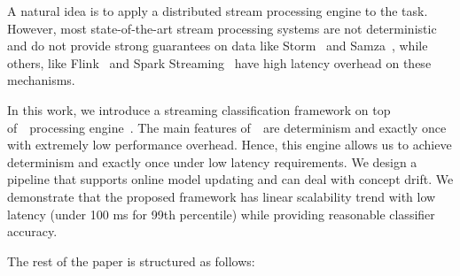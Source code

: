 A natural idea is to apply a distributed stream processing engine to the task. However, most state-of-the-art stream processing systems are not deterministic and do not provide strong guarantees on data like Storm~\cite{apache:storm} and Samza~\cite{Noghabi:2017:SSS:3137765.3137770}, while others, like Flink~\cite{Carbone:2017:SMA:3137765.3137777} and Spark Streaming~\cite{Zaharia:2012:DSE:2342763.2342773} have high latency overhead on these mechanisms. 

In this work, we introduce a streaming classification framework on top of~\FlameStream\ processing engine~\cite{we2018beyondmr, we2018adbis}. The main features of~\FlameStream\ are determinism and exactly once with extremely low performance overhead. Hence, this engine allows us to achieve determinism and exactly once under low latency requirements. We design a pipeline that supports online model updating and can deal with concept drift. We demonstrate that the proposed framework has linear scalability trend with low latency (under 100 ms for 99th percentile) while providing reasonable classifier accuracy.

The rest of the paper is structured as follows:
